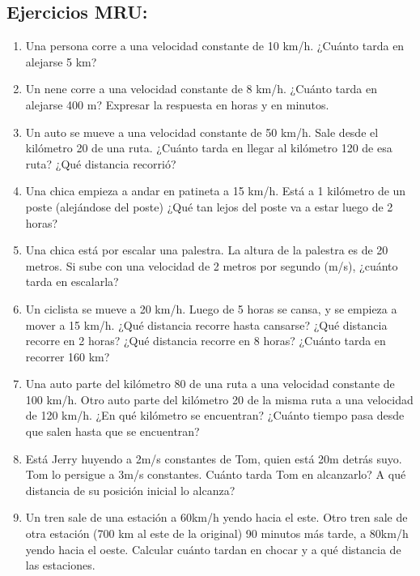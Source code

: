 \subsection*{Ejercicios MRU:}

\begin{enumerate}

\item Una persona corre a una velocidad constante de 10 km/h. ¿Cuánto tarda en alejarse 5 km? %

\item Un nene corre a una velocidad constante de 8 km/h. ¿Cuánto tarda en alejarse 400 m? Expresar la respuesta en horas y en minutos. %

\item Un auto se mueve a una velocidad constante de 50 km/h. Sale desde el kilómetro 20 de una ruta. ¿Cuánto tarda en llegar al kilómetro 120 de esa ruta? ¿Qué distancia recorrió? %

\item Una chica empieza a andar en patineta a 15 km/h. Está a 1 kilómetro de un poste (alejándose del poste) ¿Qué tan lejos del poste va a estar luego de 2 horas?

\item Una chica está por escalar una palestra. La altura de la palestra es de 20 metros. Si sube con una velocidad de 2 metros por segundo (m/s), ¿cuánto tarda en escalarla?

\item Un ciclista se mueve a 20 km/h. Luego de 5 horas se cansa, y se empieza a mover a 15 km/h. ¿Qué distancia recorre hasta cansarse? ¿Qué distancia recorre en 2 horas? ¿Qué distancia recorre en 8 horas? ¿Cuánto tarda en recorrer 160 km? %

\item Una auto parte del kilómetro 80 de una ruta a una velocidad constante de 100 km/h. Otro auto parte del kilómetro 20 de la misma ruta a una velocidad de 120 km/h. ¿En qué kilómetro se encuentran? ¿Cuánto tiempo pasa desde que salen hasta que se encuentran? %

\item Está Jerry huyendo a 2m/s constantes de Tom, quien está 20m detrás suyo. Tom lo persigue a 3m/s constantes. Cuánto tarda Tom en alcanzarlo? A qué distancia de su posición inicial lo alcanza?

\item Un tren sale de una estación a 60km/h yendo hacia el este. Otro tren sale de otra estación (700 km al este de la original) 90 minutos más tarde, a 80km/h yendo hacia el oeste. Calcular cuánto tardan en chocar y a qué distancia de las estaciones.

\end{enumerate}

